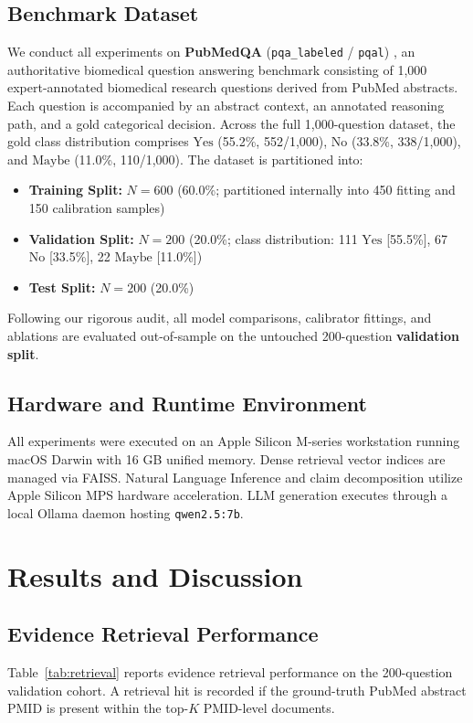 \documentclass[journal,10pt]{IEEEtran}
\begin{document}
\subsection{Benchmark Dataset}
We conduct all experiments on \textbf{PubMedQA} (\texttt{pqa\_labeled} / \texttt{pqal}) \cite{jin2019pubmedqa}, an authoritative biomedical question answering benchmark consisting of 1,000 expert-annotated biomedical research questions derived from PubMed abstracts. Each question is accompanied by an abstract context, an annotated reasoning path, and a gold categorical decision. Across the full 1,000-question dataset, the gold class distribution comprises $\text{Yes}$ (55.2\%, 552/1,000), $\text{No}$ (33.8\%, 338/1,000), and $\text{Maybe}$ (11.0\%, 110/1,000). The dataset is partitioned into:
\begin{itemize}
    \item \textbf{Training Split:} $N=600$ (60.0\%; partitioned internally into 450 fitting and 150 calibration samples)
    \item \textbf{Validation Split:} $N=200$ (20.0\%; class distribution: 111 $\text{Yes}$ [55.5\%], 67 $\text{No}$ [33.5\%], 22 $\text{Maybe}$ [11.0\%])
    \item \textbf{Test Split:} $N=200$ (20.0\%)
\end{itemize}

Following our rigorous audit, all model comparisons, calibrator fittings, and ablations are evaluated out-of-sample on the untouched 200-question \textbf{validation split}.

\subsection{Hardware and Runtime Environment}
All experiments were executed on an Apple Silicon M-series workstation running macOS Darwin with 16 GB unified memory. Dense retrieval vector indices are managed via FAISS. Natural Language Inference and claim decomposition utilize Apple Silicon MPS hardware acceleration. LLM generation executes through a local Ollama daemon hosting \texttt{qwen2.5:7b}.

\section{Results and Discussion}

\subsection{Evidence Retrieval Performance}
Table~\ref{tab:retrieval} reports evidence retrieval performance on the 200-question validation cohort. A retrieval hit is recorded if the ground-truth PubMed abstract PMID is present within the top-$K$ PMID-level documents.
\end{document}
